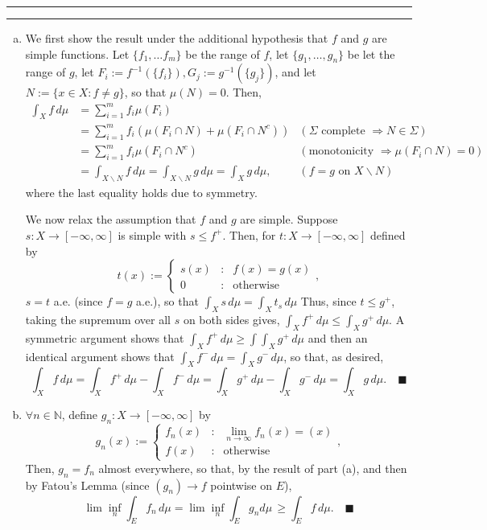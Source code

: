 \documentclass[11pt]{article}
\newcounter{questionCounter}
\newcounter{partCounter}[questionCounter]
\newenvironment{question}[2][\arabic{questionCounter}]{%
    \setcounter{partCounter}{0}%
    \vspace{.25in} \hrule \vspace{0.5em}%
        \noindent{\bf #2}%
    \vspace{0.8em} \hrule \vspace{.10in}%
    \addtocounter{questionCounter}{1}%
}{}
\newcommand{\mqed}{\quad \blacksquare}
\newcommand{\inv}{^{-1}}
\newcommand{\sminus}{\backslash}
\newcommand{\N}{\mathbb{N}} %
\begin{document}
\begin{question}{Problem 2}
\begin{enumerate}[(a)]
\item We first show the result under the additional hypothesis that $f$ and
$g$ are simple functions. Let $\{f_1,\dots f_m\}$ be the range of $f$, let
$\{g_1,\dots,g_n\}$ be let the range of $g$, let
$F_i := f\inv(\{f_i\}), G_j := g\inv(\{g_j\})$, and let
$N := \{x \in X : f \neq g\}$, so that $\mu(N) = 0$.
Then,
\begin{align*}
\int_X f \, d\mu
 & = \sum_{i = 1}^m f_i \mu(F_i) \\
 & = \sum_{i = 1}^m f_i (\mu(F_i \cap N) + \mu(F_i \cap N^c))
                    & (\mbox{$\Sigma$ complete $\Rightarrow N \in \Sigma$}) \\
 & = \sum_{i = 1}^m f_i \mu(F_i \cap N^c)
                  & (\mbox{monotonicity $\Rightarrow \mu(F_i \cap N) = 0$}) \\
 & = \int_{X \sminus N} f \, d\mu
   = \int_{X \sminus N} g \, d\mu
   = \int_X g \, d\mu, & (\mbox{$f = g$ on $X \sminus N$})
\end{align*}
where the last equality holds due to symmetry.

We now relax the assumption that $f$ and $g$ are simple. Suppose
$s: X \rightarrow [-\infty,\infty]$ is simple with $s \leq f^+$. Then, for
$t: X \rightarrow [-\infty,\infty]$ defined by
\[t(x) :=   \left\{
                \begin{array}{lcr}
                    s(x) & : & f(x) = g(x) \\
                    0    & : & \mbox{otherwise}
                \end{array}
            \right.,\]
$s = t$ a.e. (since $f = g$ a.e.), so that
$\int_X s \, d\mu = \int_X t_s \, d\mu$ Thus, since $t \leq g^+$, taking
the supremum over all $s$ on both sides gives,
$\int_X f^+ \, d\mu \leq \int_X g^+ \, d\mu$.
A symmetric argument shows that
$\int_X f^+ \, d\mu \geq \int \int_X g^+ \, d\mu$
and then an identical argument shows that
$\int_X f^- \, d\mu = \int_X g^- \, d\mu$, so that, as desired,
\[\int_X f \, d\mu
 = \int_X f^+ \, d\mu - \int_X f^- \, d\mu
 = \int_X g^+ \, d\mu - \int_X g^- \, d\mu
 = \int_X g \, d\mu. \mqed\]

\item $\forall n \in \N$, define $g_n: X \rightarrow [-\infty,\infty]$ by
\[g_n(x) := \left\{
                \begin{array}{lcr}
                    f_n(x)  & : & \lim_{n \rightarrow \infty} f_n(x) = (x) \\
                    f(x)    & : & \mbox{otherwise}
                \end{array}
            \right.,\]
Then, $g_n = f_n$ almost everywhere, so that, by the result of part (a), and
then by Fatou's Lemma (since $(g_n) \rightarrow f$ pointwise on $E$),
\[\lim \inf_n \int_E f_n \, d\mu
 =    \lim \inf_n \int_E g_n d\mu \,
 \geq \int_E f \, d\mu. \mqed\]
\end{enumerate}
\end{question}
\end{document}

